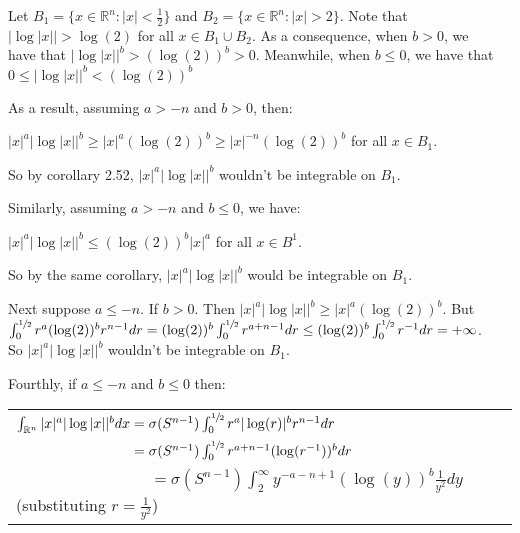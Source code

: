 \documentclass{book}
\newcommand{\exTwoP}{%
   \color{RedViolet}%
   \fontsize{13}{15}\selectfont%
}
\newenvironment{myIndent}{%
   \begin{adjustwidth}{2.5em}{0em}%
}{%
   \end{adjustwidth}%
}
\newcommand{\retTwo}{\hfill\bigbreak}
\begin{document}
\begin{myIndent}\exTwoP
	Let $B_1 = \{x \in \mathbb{R}^n : |x| < \frac{1}{2}\}$ and $B_2 = \{x \in \mathbb{R}^n : |x| > 2\}$. Note that\\ $|\log|x|| > \log(2)$ for all $x \in B_1 \cup B_2$. As a consequence, when $b > 0$, we\\ have that $|\log|x||^b > (\log(2))^b > 0$. Meanwhile, when $b \leq 0$, we have that\\ $0 \leq |\log|x||^b < (\log(2))^b$\retTwo

	As a result, assuming $a > -n$ and $b > 0$, then:
	
	{\centering $|x|^a|\log|x||^b \geq |x|^a(\log(2))^b \geq |x|^{-n}(\log(2))^b$ for all $x \in B_1$.\retTwo\par}
	
	So by corollary 2.52, $|x|^a|\log|x||^b$ wouldn't be integrable on $B_1$.\retTwo

	Similarly, assuming $a > -n$ and $b \leq 0$, we have:
	
	{\centering $|x|^a\left|\log|x|\right|^b \leq (\log(2))^b|x|^a$ for all $x \in B^1$.\newpage\par}

	So by the same corollary, $|x|^a|\log|x||^b$ would be integrable on $B_1$.\retTwo

	Next suppose $a \leq -n$. If $b > 0$. Then $|x|^a|\log|x||^b \geq |x|^a(\log(2))^b$. But\\ $\int_0^{\sfrac{1}{2}} r^a(\log(2))^br^{n-1}dr = (\log(2))^b\int_0^{\sfrac{1}{2}} r^{a + n-1}dr \leq (\log(2))^b\int_0^{\sfrac{1}{2}} r^{-1}dr = +\infty$.\\ So $|x|^a|\log|x||^b$ wouldn't be integrable on $B_1$.\retTwo

	Fourthly, if $a \leq -n$ and $b \leq 0$ then:
	
	{\centering 
	\begin{tabular}{l}
		$\int_{\mathbb{R}^n} |x|^a|\log|x||^b dx = \sigma(S^{n-1})\int_{0}^{\sfrac{1}{2}}r^{a}|\log(r)|^b r^{n-1}dr$\\ [4pt]

		$\phantom{\int_{\mathbb{R}^n} |x|^a|\log|x||^b dx} = \sigma(S^{n-1})\int_{0}^{\sfrac{1}{2}}r^{a+n-1}(\log(r^{-1}))^b dr$\\ [4pt]

		$\phantom{\int_{\mathbb{R}^n} |x|^a|\log|x||^b dx} = \sigma(S^{n-1})\int_{2}^{\infty}y^{-a-n+1}(\log(y))^b \frac{1}{y^2}dy$ (substituting $r = \frac{1}{y^2}$)\\ [4pt]


\end{tabular}}
\end{myIndent}
\end{document}
